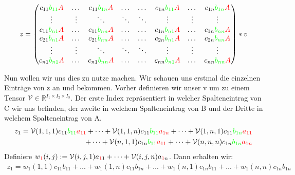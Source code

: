 \begin{equation} \label{eq:matrix} z=
\begin{pmatrix}
c_{11} \textcolor{green}{b_{11}} \textcolor{red}{A} & \dots  & c_{11} \textcolor{green}{b_{1n}} \textcolor{red}{A} & \dots & \dots & c_{1n}\textcolor{green}{b_{11}}\textcolor{red}{A} & \dots & c_{1n}\textcolor{green}{b_{1n}}\textcolor{red}{A}  \\

\vdots & \vdots & \ddots & \ddots  & \ddots & \vdots & \vdots & \vdots \\
c_{11} \textcolor{green}{b_{n1}} \textcolor{red}{A} & \dots  & c_{11} \textcolor{green}{b_{nn}} \textcolor{red}{A} & \dots & \dots & c_{1n}\textcolor{green}{b_{n1}}\textcolor{red}{A} & \dots & c_{1n}\textcolor{green}{b_{nn}}\textcolor{red}{A}  \\
c_{21} \textcolor{green}{b_{n1}} \textcolor{red}{A} & \dots  & c_{21} \textcolor{green}{b_{nn}} \textcolor{red}{A} & \dots & \dots & c_{2n}\textcolor{green}{b_{n1}}\textcolor{red}{A} & \dots & c_{2n}\textcolor{green}{b_{nn}}\textcolor{red}{A}  \\
\vdots & \vdots & \ddots & \ddots  & \ddots & \vdots & \vdots & \vdots \\
c_{n1} \textcolor{green}{b_{n1}} \textcolor{red}{A} & \dots  & c_{n1} \textcolor{green}{b_{nn}} \textcolor{red}{A} & \dots & \dots & c_{nn}\textcolor{green}{b_{n1}}\textcolor{red}{A} & \dots & c_{nn}\textcolor{green}{b_{nn}}\textcolor{red}{A}  \\
\end{pmatrix} * v
\end{equation}

Nun wollen wir uns dies zu nutze machen. Wir schauen uns erstmal die einzelnen Einträge von z an und bekommen. Vorher definieren wir unser v um zu einem Tensor $\mathcal{V} \in \mathbb{R}^{I_1 \times I_2 \times I_3} $. Der erste Index repräsentiert in welcher Spalteneintrag von C wir uns befinden, der zweite in welchem Spalteneintrag von B und der Dritte in welchem Spalteneintrag von A. 
\begin{equation} \label{eq:zold}
\begin{aligned}
z_{1} = \mathcal{V}(1,1,1) c_{11} \textcolor{green}{b_{11}} \textcolor{red}{a_{11}}+ \dots +  \mathcal{V}(1,1,n) c_{11} \textcolor{green}{b_{11}} \textcolor{red}{a_{1n}} + \dots  +  \mathcal{V}(1,n,1)c_{11} 
\textcolor{green}{b_{1n}} \textcolor{red}{a_{11}} \\ + \dots +  \mathcal{V}(n,1,1) c_{1n} \textcolor{green}{b_{11}} \textcolor{red}{a_{11}} + \dots +  \mathcal{V}(n,n,n) c_{1n} \textcolor{green}{b_{1n}} \textcolor{red}{a_{1n}}
\end{aligned}
\end{equation}
Definiere $w_{\textcolor{red}{1}}(i,j) :=\mathcal{V}(i,j,1) a_{\textcolor{red}{1}1}+\dots+\mathcal{V}(i,j,n) a_{\textcolor{red}{1}n}$. Dann erhalten wir:
\begin{equation*}
\begin{aligned}
z_{1}= w_1(1,1) c_{11} b_{11} + \dots +   w_1(1,n) c_{11} b_{1n} + \dots + w_1(n,1) c_{1n} b_{11}  + \dots +  w_1(n,n) c_{1n} b_{1n} 
\end{aligned}
\end{equation*}

